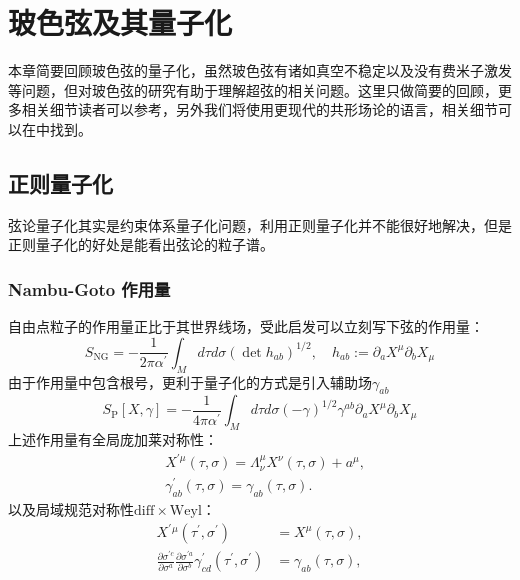 \chapter{玻色弦及其量子化}
\label{chap:2}
本章简要回顾玻色弦的量子化，虽然玻色弦有诸如真空不稳定以及没有费米子激发等问题，但对玻色弦的研究有助于理解超弦的相关问题。这里只做简要的回顾，更多相关细节读者可以参考\cite{Polchinski:1998rq,Blumenhagen:2013fgp,Becker:2006dvp}，另外我们将使用更现代的共形场论的语言，相关细节可以在\cite{DiFrancesco:1997nk,Blumenhagen:2009zz}中找到。

\section{正则量子化}
弦论量子化其实是约束体系量子化问题，利用正则量子化并不能很好地解决，但是正则量子化的好处是能看出弦论的粒子谱。
\subsection{Nambu-Goto 作用量}
自由点粒子的作用量正比于其世界线场，受此启发可以立刻写下弦的作用量：
\begin{equation}
	S_{\text{NG}}=-\frac{1}{2\pi\alpha^\prime}\int_M d\tau d\sigma \left(\det h_{ab}\right)^{1/2},\quad h_{ab}:=\partial_a X^\mu \partial_b X_\mu
\end{equation}
由于作用量中包含根号，更利于量子化的方式是引入辅助场$\gamma_{ab}$
\begin{equation}
	\label{eq:2.2}
	S_\mathrm{P}[X,\gamma]=-\frac{1}{4\pi\alpha^{\prime}}\int_Md\tau d\sigma\left(-\gamma\right)^{1/2}\gamma^{ab}\partial_aX^\mu\partial_bX_\mu
\end{equation}
上述作用量有全局庞加莱对称性：
\begin{equation}
	\begin{aligned}&X^{\prime\mu}(\tau,\sigma)=\Lambda_{\nu}^{\mu}X^{\nu}(\tau,\sigma)+a^{\mu},\\&\gamma_{ab}^{\prime}(\tau,\sigma)=\gamma_{ab}(\tau,\sigma).\end{aligned}
\end{equation}
以及局域规范对称性$\mathrm{diff}\times\mathrm{Weyl}$：
\begin{equation}
	\begin{aligned}
		X^{\prime}{}^{\mu}(\tau^{\prime},\sigma^{\prime})&=X^{\mu}(\tau,\sigma),\\ \frac{\partial\sigma^{\prime c}}{\partial\sigma^a}\frac{\partial\sigma^{\prime a}}{\partial\sigma^b}\gamma_{cd}^{\prime}(\tau^{\prime},\sigma^{\prime})&=\gamma_{ab}(\tau,\sigma),
	\end{aligned}
\end{equation}
	
